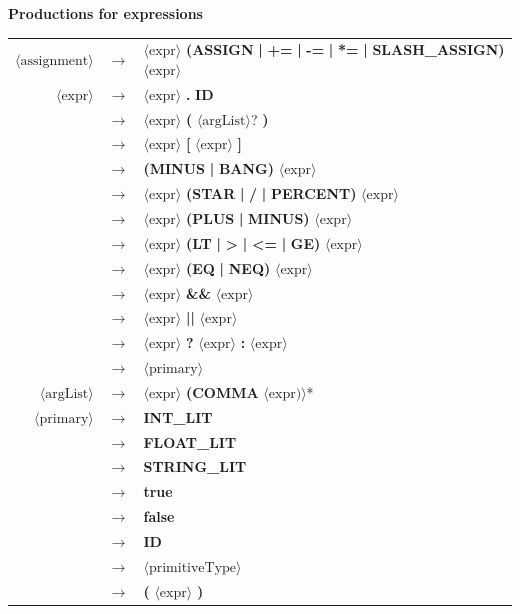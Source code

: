 \documentclass[11pt,a4paper]{article}
\begin{document}
\noindent\textbf{Productions for expressions}

\begin{longtable}{r c l}
$\langle\text{assignment}\rangle$ & $\rightarrow$ & $\langle\text{expr}\rangle$ \textbf{(ASSIGN} \textbf{|} \textbf{+=} \textbf{|} \textbf{-=} \textbf{|} \textbf{*=} \textbf{|} \textbf{SLASH\_ASSIGN)} $\langle\text{expr}\rangle$ \\
$\langle\text{expr}\rangle$ & $\rightarrow$ & $\langle\text{expr}\rangle$ \textbf{.} \textbf{ID} \\
 & $\rightarrow$ & $\langle\text{expr}\rangle$ \textbf{(} $\langle\text{argList}\rangle$? \textbf{)} \\
 & $\rightarrow$ & $\langle\text{expr}\rangle$ \textbf{[} $\langle\text{expr}\rangle$ \textbf{]} \\
 & $\rightarrow$ & \textbf{(MINUS} \textbf{|} \textbf{BANG)} $\langle\text{expr}\rangle$ \\
 & $\rightarrow$ & $\langle\text{expr}\rangle$ \textbf{(STAR} \textbf{|} \textbf{/} \textbf{|} \textbf{PERCENT)} $\langle\text{expr}\rangle$ \\
 & $\rightarrow$ & $\langle\text{expr}\rangle$ \textbf{(PLUS} \textbf{|} \textbf{MINUS)} $\langle\text{expr}\rangle$ \\
 & $\rightarrow$ & $\langle\text{expr}\rangle$ \textbf{(LT} \textbf{|} \textbf{>} \textbf{|} \textbf{<=} \textbf{|} \textbf{GE)} $\langle\text{expr}\rangle$ \\
 & $\rightarrow$ & $\langle\text{expr}\rangle$ \textbf{(EQ} \textbf{|} \textbf{NEQ)} $\langle\text{expr}\rangle$ \\
 & $\rightarrow$ & $\langle\text{expr}\rangle$ \textbf{\&\&} $\langle\text{expr}\rangle$ \\
 & $\rightarrow$ & $\langle\text{expr}\rangle$ \textbf{||} $\langle\text{expr}\rangle$ \\
 & $\rightarrow$ & $\langle\text{expr}\rangle$ \textbf{?} $\langle\text{expr}\rangle$ \textbf{:} $\langle\text{expr}\rangle$ \\
 & $\rightarrow$ & $\langle\text{primary}\rangle$ \\
$\langle\text{argList}\rangle$ & $\rightarrow$ & $\langle\text{expr}\rangle$ \textbf{(COMMA} $\langle\text{expr)}\rangle$* \\
$\langle\text{primary}\rangle$ & $\rightarrow$ & \textbf{INT\_LIT} \\
 & $\rightarrow$ & \textbf{FLOAT\_LIT} \\
 & $\rightarrow$ & \textbf{STRING\_LIT} \\
 & $\rightarrow$ & \textbf{true} \\
 & $\rightarrow$ & \textbf{false} \\
 & $\rightarrow$ & \textbf{ID} \\
 & $\rightarrow$ & $\langle\text{primitiveType}\rangle$ \\
 & $\rightarrow$ & \textbf{(} $\langle\text{expr}\rangle$ \textbf{)} \\
\end{longtable}
\end{document}
